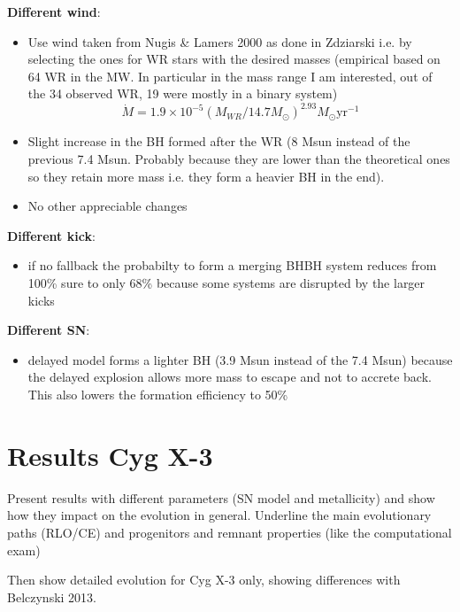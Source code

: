 \documentclass[a4paper,titlepage]{book}     	%
\newcommand{\sun}{\ensuremath{_\odot}}
\newcommand{\msun}{\ensuremath{M\sun}}
\newcommand{\yr}{\text{yr}}
\begin{document}
\textbf{Different wind}:\\
\begin{itemize}
	\item Use wind taken from Nugis \& Lamers 2000 as done in Zdziarski i.e. by selecting the ones for WR stars with the desired masses (empirical based on 64 WR in the MW. In particular in the mass range I am interested, out of the 34 observed WR, 19 were mostly in a binary system)
	\[\dot{M} = 1.9\times10^{-5}(M_{WR}/14.7\msun)^{2.93} \msun \yr^{-1}\]
	\item Slight increase in the BH formed after the WR (8 Msun instead of the previous 7.4 Msun. Probably because they are lower than the theoretical ones so they retain more mass i.e. they form a heavier BH in the end). 
	\item No other appreciable changes
\end{itemize}

\textbf{Different kick}:
\begin{itemize}
	\item if no fallback the probabilty to form a merging BHBH system reduces from 100\% sure to only 68\% because some systems are disrupted by the larger kicks
\end{itemize}


\textbf{Different SN}:
\begin{itemize}
	\item delayed model forms a lighter BH (3.9 Msun instead of the 7.4 Msun) because the delayed explosion allows more mass to escape and not to accrete back. This also lowers the formation efficiency to 50\% 
\end{itemize}








\section{Results Cyg X-3}
Present results with different parameters (SN model and metallicity) and show how they impact on the evolution in general. Underline the main evolutionary paths (RLO/CE) and progenitors and remnant properties (like the computational exam)

Then show detailed evolution for Cyg X-3 only, showing differences with Belczynski 2013.





\printbibliography[heading=bibintoc]
\end{document}
